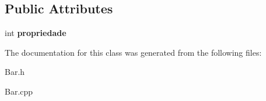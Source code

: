 \subsection*{\-Public \-Attributes}
\begin{DoxyCompactItemize}
\item 
\hypertarget{classBar_a1c43e4dbc19017c6102ea62eb8aa6ec9}{int {\bfseries propriedade}}\label{classBar_a1c43e4dbc19017c6102ea62eb8aa6ec9}

\end{DoxyCompactItemize}


\-The documentation for this class was generated from the following files\-:\begin{DoxyCompactItemize}
\item 
\-Bar.\-h\item 
\-Bar.\-cpp\end{DoxyCompactItemize}
